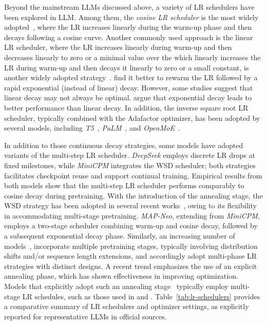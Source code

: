 Beyond the mainstream LLMs discussed above, a variety of LR schedulers have been explored in LLM. Among them, the \textit{cosine LR scheduler} is the most widely adopted~\cite{kaplan2020scaling, hoffmann2022training, rae2021scaling, gunter2024apple, cai2024internlm2, touvron2023llama, touvron2023llama2, dubey2024llama, brown2020language, olmo20242, tang2025pangu, bai2023qwen, almazrouei2023falcon}, where the LR increases linearly during the warm-up phase and then decays following a cosine curve.
Another commonly used approach is the linear LR scheduler, where the LR increases linearly during warm-up and then decreases linearly to zero or a minimal value over the which linearly increases the LR during warm-up and then decays it linearly to zero or a small constant, is another widely adopted strategy~\cite{zhang2022opt, abdin2024phi, bergsma2025straight, defazio2023optimal}.
\cite{glorioso2024zamba, ibrahim2024simple, hu2024minicpm} find it better to rewarm the LR followed by a rapid exponential (instead of linear) decay.
However, some studies suggest that linear decay may not always be optimal. \cite{glorioso2024zamba, ibrahim2024simple, hu2024minicpm} argue that exponential decay leads to better performance than linear decay.
In addition, the inverse square root LR scheduler, typically combined with the Adafactor optimizer, has been adopted by several models, including \textit{T5}~\cite{raffel2020exploring}, \textit{PaLM}~\cite{chowdhery2023palm}, and \textit{OpenMoE}~\cite{xue2024openmoe}.

In addition to those continuous decay strategies, some models have adopted variants of the multi-step LR scheduler. \textit{DeepSeek} employs discrete LR drops at fixed milestones, while \textit{MiniCPM} integrates the WSD scheduler; both strategies facilitates checkpoint reuse and support continual training. Empirical results from both models show that the multi-step LR scheduler performs comparably to cosine decay during pretraining. With the introduction of the annealing stage, the WSD strategy has been adopted in several recent works~\cite{hu2024yulan, allal2025smollm2, huang2024opencoder}, owing to its flexibility in accommodating multi-stage pretraining.
\textit{MAP-Neo}, extending from \textit{MiniCPM}, employs a two-stage scheduler combining warm-up and cosine decay, followed by a subsequent exponential decay phase. Similarly, an increasing number of models~\cite{sun2024hunyuan,li2025minimax,wake2024yi,nijkamp2025xgen}, incorporate multiple pretraining stages, typically involving distribution shifts and/or sequence length extensions, and accordingly adopt multi-phase LR strategies with distinct designs. A recent trend emphasizes the use of an explicit annealing phase, which has shown effectiveness in improving optimization. Models that explicitly adopt such an annealing stage~\cite{} typically employ multi-stage LR schedules, such as those used in \cite{hu2024minicpm} and \cite{bi2024deepseek}.
Table~\ref{tab:lr-schedulers} provides a comparative summary of LR schedulers and optimizer settings, as explicitly reported for representative LLMs in official sources.



